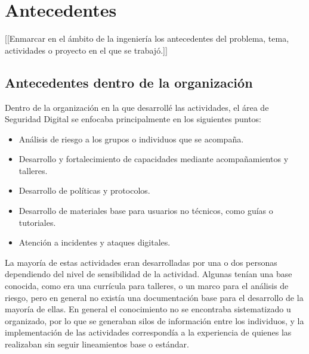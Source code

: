 \documentclass[12pt]{caltech_thesis}
\begin{document}

\chapter{Antecedentes}

[[Enmarcar en el ámbito de la ingeniería los antecedentes del problema, tema, actividades o proyecto en el que se trabajó.]]

\section{Antecedentes dentro de la organización}

Dentro de la organización en la que desarrollé las actividades, el área de Seguridad Digital se enfocaba principalmente en los siguientes puntos:

\begin{itemize}
    \item Análisis de riesgo a los grupos o individuos que se acompaña.
    \item Desarrollo y fortalecimiento de capacidades mediante acompañamientos y talleres.
    \item Desarrollo de políticas y protocolos.
    \item Desarrollo de materiales base para usuarios no técnicos, como guías o tutoriales.
    \item Atención a incidentes y ataques digitales.
\end{itemize}

La mayoría de estas actividades eran desarrolladas por una o dos personas dependiendo del nivel de sensibilidad de la actividad. Algunas tenían una base conocida, como era una currícula para talleres, o un marco para el análisis de riesgo, pero en general no existía una documentación base para el desarrollo de la mayoría de ellas. En general el conocimiento no se encontraba sistematizado u organizado, por lo que se generaban silos de información entre los individuos, y la implementación de las actividades correspondía a la experiencia de quienes las realizaban sin seguir lineamientos base o estándar.
\end{document}
